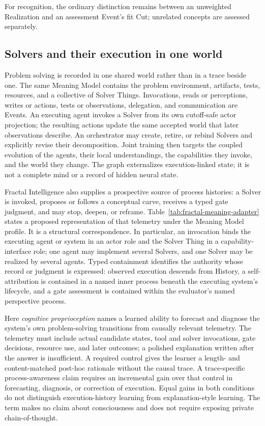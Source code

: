 \documentclass[10pt]{article}
\begin{document}
For recognition, the ordinary distinction remains between an unweighted Realization
and an assessment Event's fit Cut; unrelated concepts are assessed separately.

\subsection{Solvers and their execution in one world}
\label{sec:solvers}

Problem solving is recorded in one shared world rather than in a trace beside one. The same Meaning Model
contains the problem environment, artifacts, tests, resources, and a collective
of Solver Things. Invocations, reads or perceptions, writes or actions, tests
or observations, delegation, and communication are Events. An executing agent
invokes a Solver from its own cutoff-safe actor projection; the resulting
actions update the same accepted world that later observations describe.
An orchestrator may create, retire, or
rebind Solvers and explicitly revise their decomposition. Joint training then
targets the coupled evolution of the agents, their local understandings, the
capabilities they invoke, and the world they change. The graph externalizes execution-linked state; it is
not a complete mind or a record of hidden neural state.

Fractal Intelligence also supplies a prospective source of process
histories: a Solver is invoked, proposes or follows a conceptual carve, receives
a typed gate judgment, and may stop, deepen, or reframe.
Table~\ref{tab:fractal-meaning-adapter} states a
proposed representation of that telemetry under the Meaning Model profile. It
is a structural correspondence. In particular, an
invocation binds the executing agent or system in an actor role and the Solver
Thing in a capability-interface role; one agent may implement several Solvers,
and one Solver may be realized by several agents. Typed containment identifies
the authority whose record or judgment is expressed: observed execution
descends from History, a self-attribution is contained in a named inner process
beneath the executing system's lifecycle, and a gate assessment is contained
within the evaluator's named perspective process.

Here \emph{cognitive proprioception} names a learned ability to forecast and
diagnose the system's own problem-solving transitions from causally relevant
telemetry. The telemetry must include actual candidate states, tool and solver
invocations, gate decisions, resource use, and later outcomes; a polished
explanation written after the answer is insufficient. A required control gives
the learner a length- and content-matched post-hoc rationale without the causal
trace. A trace-specific process-awareness claim requires an incremental gain
over that control in forecasting, diagnosis, or correction of execution.
Equal gains in both conditions do not distinguish execution-history learning
from explanation-style learning. The term makes no claim about consciousness
and does not require exposing private chain-of-thought.
\end{document}
